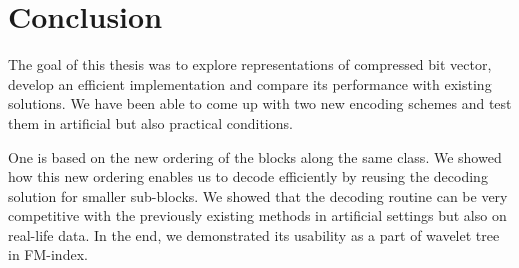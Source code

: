 \chapter*{Conclusion}  %

The goal of this thesis was to explore representations of compressed
bit vector, develop an efficient implementation and compare its
performance with existing solutions. We have been able to come up with
two new encoding schemes and test them in artificial but also practical
conditions.

One is based on the new ordering of the blocks along the same class. We
showed how this new ordering enables us to decode efficiently by reusing
the decoding solution for smaller sub-blocks. We showed that the decoding
routine can be very competitive with the previously existing methods in
artificial settings but also on real-life data. In the end, we demonstrated
its usability as a part of wavelet tree in FM-index.



